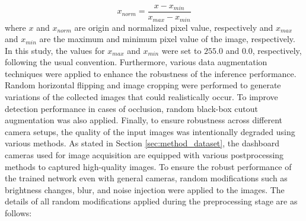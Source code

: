 \begin{equation}
    x_{norm} = \frac{x - x_{min}}{x_{max} - x_{min}}
\end{equation}
where $x$ and $x_{norm}$ are origin and normalized pixel value, respectively and $x_{max}$ and $x_{min}$ are the maximum and minimum pixel value of the image, respectively.
In this study, the values for $x_{max}$ and $x_{min}$ were set to $255.0$ and $0.0$, respectively, following the usual convention.
Furthermore, various data augmentation techniques were applied to enhance the robustness of the inference performance.
Random horizontal flipping and image cropping were performed to generate variations of the collected images that could realistically occur.
To improve detection performance in cases of occlusion, random black-box cutout augmentation was also applied.
Finally, to ensure robustness across different camera setups, the quality of the input images was intentionally degraded using various methods.
As stated in Section \ref{sec:method_dataset}, the dashboard cameras used for image acquisition are equipped with various postprocessing methods to captured high-quality images.
To ensure the robust performance of the trained network even with general cameras, random modifications such as brightness changes, blur, and noise injection were applied to the images.
The details of all random modifications applied during the preprocessing stage are as follows:

